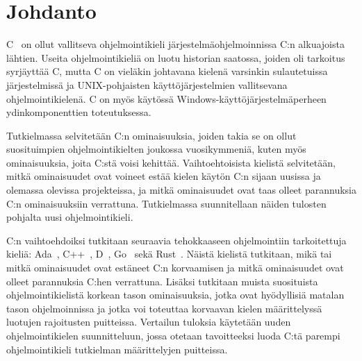 \section{Johdanto} 

C~\citep{C18} on ollut vallitseva ohjelmointikieli järjestelmäohjelmoinnissa
C:n alkuajoista lähtien. Useita ohjelmointikieliä on luotu historian saatossa,
joiden oli tarkoitus syrjäyttää C, mutta C on vieläkin johtavana kielenä
varsinkin sulautetuissa järjestelmissä ja UNIX-pohjaisten käyttöjärjestelmien
vallitsevana ohjelmointikielenä. C on myös käytössä
Windows-käyttöjärjestelmäperheen ydinkomponenttien toteutuksessa.

Tutkielmassa selvitetään C:n ominaisuuksia, joiden takia se on ollut
suosituimpien ohjelmointikielten joukossa vuosikymmeniä, kuten myös
ominaisuuksia, joita C:stä voisi kehittää. Vaihtoehtoisista kielistä
selvitetään, mitkä ominaisuudet ovat voineet estää kielen käytön C:n sijaan
uusissa ja olemassa olevissa projekteissa, ja mitkä ominaisuudet ovat taas
olleet parannuksia C:n ominaisuuksiin verrattuna. Tutkielmassa suunnitellaan
näiden tulosten pohjalta uusi ohjelmointikieli.

C:n vaihtoehdoiksi tutkitaan seuraavia tehokkaaseen ohjelmointiin tarkoitettuja
kieliä: Ada~\citep{ADA12}, C++~\citep{CPP17}, D~\citep{D}, Go~\citep{golang}
sekä Rust~\citep{rust}. Näistä kielistä tutkitaan, mikä tai mitkä ominaisuudet
ovat estäneet C:n korvaamisen ja mitkä ominaisuudet ovat olleet parannuksia
C:hen verrattuna. Lisäksi tutkitaan muista suosituista ohjelmointikielistä
korkean tason ominaisuuksia, jotka ovat hyödyllisiä matalan tason
ohjelmoinnissa ja jotka voi toteuttaa korvaavan kielen määrittelyssä luotujen
rajoitusten puitteissa. Vertailun tuloksia käytetään uuden ohjelmointikielen
suunnitteluun, jossa otetaan tavoitteeksi luoda C:tä parempi ohjelmointikieli
tutkielman määrittelyjen puitteissa.



